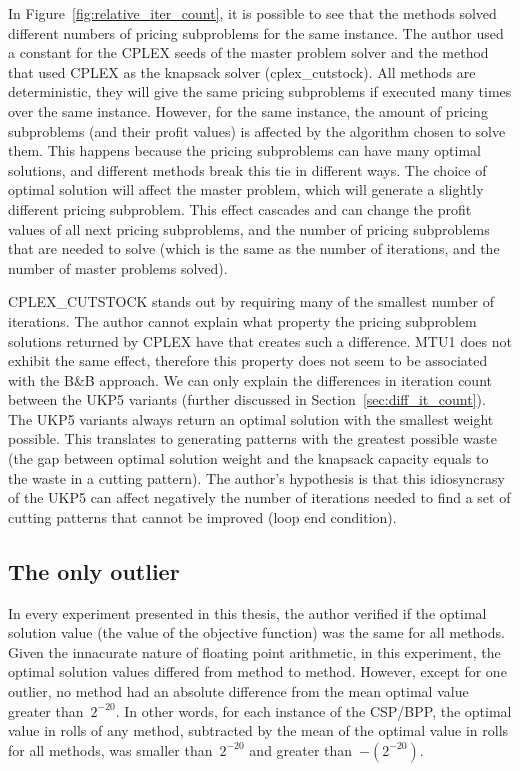 In Figure~\ref{fig:relative_iter_count}, it is possible to see that the methods solved different numbers of pricing subproblems for the same instance.
The author used a constant for the CPLEX seeds of the master problem solver and the method that used CPLEX as the knapsack solver (cplex\_cutstock).
All methods are deterministic, they will give the same pricing subproblems if executed many times over the same instance.
However, for the same instance, the amount of pricing subproblems (and their profit values) is affected by the algorithm chosen to solve them.
This happens because the pricing subproblems can have many optimal solutions, and different methods break this tie in different ways.
The choice of optimal solution will affect the master problem, which will generate a slightly different pricing subproblem.
This effect cascades and can change the profit values of all next pricing subproblems, and the number of pricing subproblems that are needed to solve (which is the same as the number of iterations, and the number of master problems solved).

CPLEX\_CUTSTOCK stands out by requiring many of the smallest number of iterations.
The author cannot explain what property the pricing subproblem solutions returned by CPLEX have that creates such a difference.
MTU1 does not exhibit the same effect, therefore this property does not seem to be associated with the B\&B approach.
We can only explain the differences in iteration count between the UKP5 variants (further discussed in Section~\ref{sec:diff_it_count}).
The UKP5 variants always return an optimal solution with the smallest weight possible.
This translates to generating patterns with the greatest possible waste (the gap between optimal solution weight and the knapsack capacity equals to the waste in a cutting pattern).
The author's hypothesis is that this idiosyncrasy of the UKP5 can affect negatively the number of iterations needed to find a set of cutting patterns that cannot be improved (loop end condition).

\subsection{The only outlier}

In every experiment presented in this thesis, the author verified if the optimal solution value (the value of the objective function) was the same for all methods.
Given the innacurate nature of floating point arithmetic, in this experiment, the optimal solution values differed from method to method.
However, except for one outlier, no method had an absolute difference from the mean optimal value greater than~\(2^{-20}\).
In other words, for each instance of the CSP/BPP, the optimal value in rolls of any method, subtracted by the mean of the optimal value in rolls for all methods, was smaller than~\(2^{-20}\) and greater than~\(-(2^{-20})\). 

